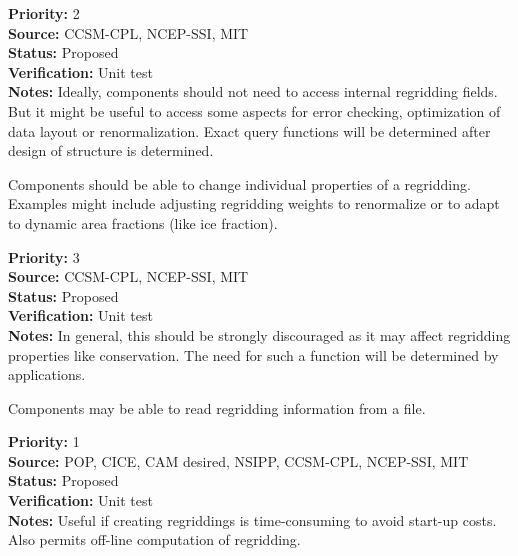 \begin{reqlist}
{\bf Priority:} 2 \\
{\bf Source:} CCSM-CPL, NCEP-SSI, MIT \\
{\bf Status:} Proposed \\
{\bf Verification:} Unit test \\
{\bf Notes:} Ideally, components should not need to access internal
             regridding fields.  But it might be useful to access some
             aspects for error checking, optimization of data layout or
             renormalization.  Exact query functions will be determined
             after design of structure is determined.
\end{reqlist}


Components should be able to change individual properties of a
regridding.  Examples might include adjusting regridding weights to 
renormalize or to adapt to dynamic area fractions (like ice fraction).

\begin{reqlist}
{\bf Priority:} 3 \\
{\bf Source:} CCSM-CPL, NCEP-SSI, MIT \\
{\bf Status:} Proposed \\
{\bf Verification:} Unit test \\
{\bf Notes:} In general, this should be strongly discouraged as it may
             affect regridding properties like conservation.  The need
             for such a function will be determined by applications.
\end{reqlist}


Components may be able to read regridding information from a file.

\begin{reqlist}
{\bf Priority:} 1 \\
{\bf Source:} POP, CICE, CAM desired, NSIPP, CCSM-CPL, NCEP-SSI, MIT \\
{\bf Status:} Proposed \\
{\bf Verification:} Unit test \\
{\bf Notes:} Useful if creating regriddings is time-consuming to avoid
             start-up costs. Also permits off-line computation of regridding.
\end{reqlist}

